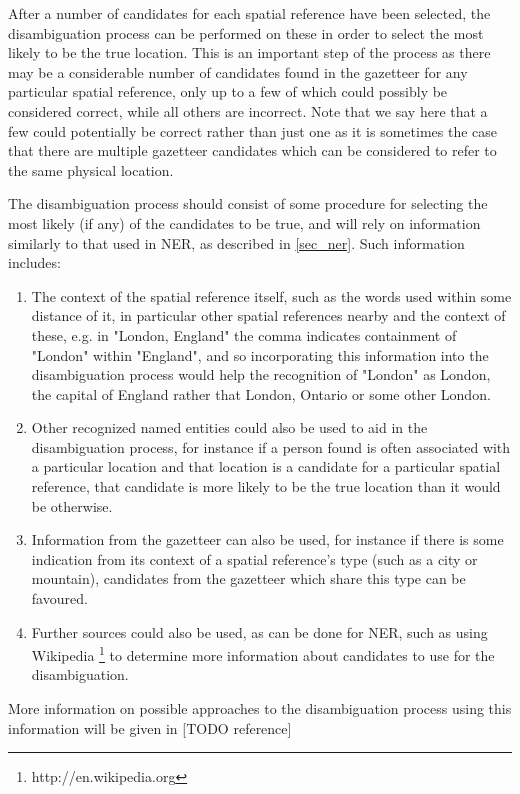\documentclass[12pt, a4paper]{report}
\begin{document}
After a number of candidates for each spatial reference have been selected, the disambiguation process can be performed on these in order to select the most likely to be the true location. This is an important step of the process as there may be a considerable number of candidates found in the gazetteer for any particular spatial reference, only up to a few of which could possibly be considered correct, while all others are incorrect. Note that we say here that a few could potentially be correct rather than just one as it is sometimes the case that there are multiple gazetteer candidates which can be considered to refer to the same physical location.

The disambiguation process should consist of some procedure for selecting the most likely (if any) of the candidates to be true, and will rely on information similarly to that used in NER, as described in \ref{sec_ner}. Such information includes:

\begin{enumerate}
	\item { The context of the spatial reference itself, such as the words used within some distance of it, in particular other spatial references nearby and the context of these, e.g. in "London, England" the comma indicates containment of "London" within "England", and so incorporating this information into the disambiguation process would help the recognition of "London" as London, the capital of England rather that London, Ontario or some other London.  	}
	\item { Other recognized named entities could also be used to aid in the disambiguation process, for instance if a person found is often associated with a particular location and that location is a candidate for a particular spatial reference, that candidate is more likely to be the true location than it would be otherwise.
	} 
	\item { Information from the gazetteer can also be used, for instance if there is some indication from its context of a spatial reference's type (such as a city or mountain), candidates from the gazetteer which share this type can be favoured. 
	} 
	\item { Further sources could also be used, as can be done for NER, such as using Wikipedia \footnote{http://en.wikipedia.org} to determine more information about candidates to use for the disambiguation.
	}

\end{enumerate}

More information on possible approaches to the disambiguation process using this information will be given in [TODO reference]
\end{document}
